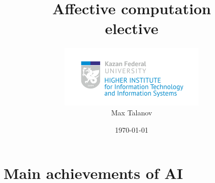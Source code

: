 \documentclass[12pt, aspectratio=169]{beamer}
\title[AC intro]{Affective computation \\elective} %
\author[Max Talanov]{
  \includegraphics[height=3cm]{ITIS_logo_bright}\\
  Max Talanov
}
\institute[ITIS: KFU] %
{
Machine cognition lab, Intellectual robotics department, ITIS \\ %
\medskip
\textit{max.talanov@gmail.com} %
}
\date{\today} %
\begin{document}
\begin{frame}
\titlepage %
\end{frame}



\section{Main achievements of AI} %
\end{document}
